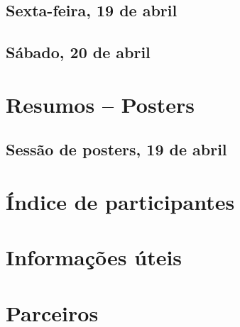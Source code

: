 \documentclass[openany, parskip=full, 12pt, a4]{scrbook}
\begin{document}


\section{Sexta-feira, 19 de abril}

\section{Sábado, 20 de abril}

\chapter{Resumos -- Posters} 

\vspace{-2.5em}

\section{Sessão de posters, 19 de abril}










\chapter{Índice de participantes}
 

 
\chapter{Informações úteis}



\chapter{Parceiros}



\newpage


\pagecolor{myblue}
\thispagestyle{empty}
\mbox{}
\end{document}
